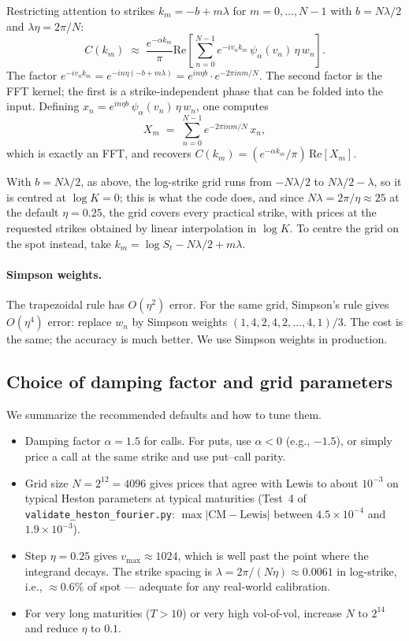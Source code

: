 \documentclass[11pt]{article}
\theoremstyle{plain}
\theoremstyle{definition}
\theoremstyle{remark}
\begin{document}
Restricting attention to strikes \(k_m = -b + m \lambda\) for \(m = 0, \ldots, N-1\) with \(b = N\lambda/2\) and \(\lambda \eta = 2\pi/N\):
\[
    C(k_m) \;\approx\; \frac{e^{-\alpha k_m}}{\pi} \mathrm{Re}\!\left[ \sum_{n=0}^{N-1} e^{-i v_n k_m}\, \psi_\alpha(v_n)\, \eta\, w_n \right].
\]
The factor \(e^{-i v_n k_m} = e^{-i n \eta (-b + m\lambda)} = e^{i n \eta b} \cdot e^{-2\pi i n m / N}\). The second factor is the FFT kernel; the first is a strike-independent phase that can be folded into the input. Defining \(x_n = e^{i n \eta b}\, \psi_\alpha(v_n)\, \eta\, w_n\), one computes
\[
    X_m \;=\; \sum_{n=0}^{N-1} e^{-2\pi i n m / N}\, x_n,
\]
which is exactly an FFT, and recovers \(C(k_m) = (e^{-\alpha k_m}/\pi)\, \mathrm{Re}[X_m]\).

With \(b = N\lambda/2\), as above, the log-strike grid runs from \(-N\lambda/2\) to \(N\lambda/2 - \lambda\), so it is centred at \(\log K = 0\); this is what the code does, and since \(N\lambda = 2\pi/\eta \approx 25\) at the default \(\eta = 0.25\), the grid covers every practical strike, with prices at the requested strikes obtained by linear interpolation in \(\log K\). To centre the grid on the spot instead, take \(k_m = \log S_t - N\lambda/2 + m\lambda\).

\paragraph{Simpson weights.} The trapezoidal rule has \(O(\eta^2)\) error. For the same grid, Simpson's rule gives \(O(\eta^4)\) error: replace \(w_n\) by Simpson weights \((1, 4, 2, 4, 2, \ldots, 4, 1)/3\). The cost is the same; the accuracy is much better. We use Simpson weights in production.

\subsection{Choice of damping factor and grid parameters}

We summarize the recommended defaults and how to tune them.

\begin{itemize}[topsep=2pt]
    \item Damping factor \(\alpha = 1.5\) for calls. For puts, use \(\alpha < 0\) (e.g., \(-1.5\)), or simply price a call at the same strike and use put--call parity.
    \item Grid size \(N = 2^{12} = 4096\) gives prices that agree with Lewis to about \(10^{-3}\) on typical Heston parameters at typical maturities (Test~4 of \texttt{validate\_heston\_fourier.py}: \(\max|\text{CM} - \text{Lewis}|\) between \(4.5 \times 10^{-4}\) and \(1.9 \times 10^{-3}\)).
    \item Step \(\eta = 0.25\) gives \(v_{\max} \approx 1024\), which is well past the point where the integrand decays. The strike spacing is \(\lambda = 2\pi/(N\eta) \approx 0.0061\) in log-strike, i.e., \(\approx 0.6\%\) of spot --- adequate for any real-world calibration.
    \item For very long maturities (\(T > 10\)) or very high vol-of-vol, increase \(N\) to \(2^{14}\) and reduce \(\eta\) to \(0.1\).
\end{itemize}
\end{document}
